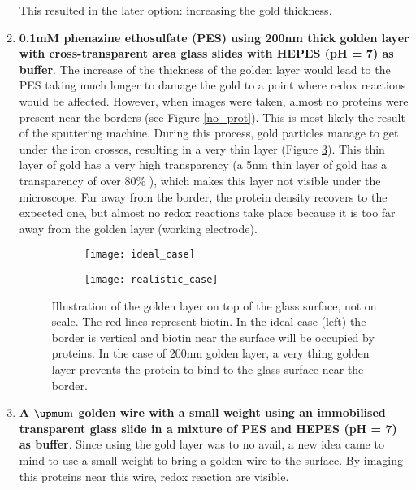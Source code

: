 \begin{enumerate}
This resulted in the later option: increasing the gold thickness.
\item \textbf{0.1mM phenazine ethosulfate (PES) using 200nm thick golden layer with cross-transparent area glass slides with HEPES (pH = 7) as buffer}. The increase of the thickness of the golden layer would lead to the PES taking much longer to damage the gold to a point where redox reactions would be affected. However, when images were taken, almost no proteins were present near the borders (see Figure \ref{no_prot}). This is most likely the result of the sputtering machine. During this process, gold particles manage to get under the iron crosses, resulting in a very thin layer (Figure \ref{goldborderillu}). This thin layer of gold has a very high transparency (a 5nm thin layer of gold has a transparency of over 80\% \cite{Kossoy2015}), which makes this layer not visible under the microscope. Far away from the border, the protein density recovers to the expected one, but almost no redox reactions take place because it is too far away from the golden layer (working electrode).



\begin{figure}
\begin{subfigure}{.5\textwidth}
  \centering
  \texttt{[image: ideal\_case]}
  \label{}
\end{subfigure}%
\begin{subfigure}{.5\textwidth}
  \centering
  \texttt{[image: realistic\_case]}
  \label{}
\end{subfigure}
\caption{Illustration of the golden layer on top of the glass surface, not on scale. The red lines represent biotin. In the ideal case (left) the border is vertical and biotin near the surface will be occupied by proteins. In the case of 200nm golden layer, a very thing golden layer prevents the protein to bind to the glass surface near the border. }
\label{goldborderillu}
\end{figure}

\item \textbf{A  $\upmu \textup{m}$ golden wire with a small weight using an immobilised transparent glass slide in a mixture of PES and HEPES (pH = 7) as buffer}. Since using the gold layer was to no avail, a new idea came to mind to use a small weight to bring a golden wire to the surface. By imaging this proteins near this wire, redox reaction are visible. 

\end{enumerate} 
